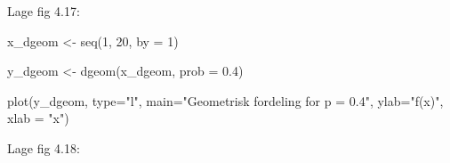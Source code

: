 \documentclass[
]{book}
\newenvironment{Shaded}{\begin{snugshade}}{\end{snugshade}}
\newcommand{\AttributeTok}[1]{\textcolor[rgb]{0.77,0.63,0.00}{#1}}
\newcommand{\DecValTok}[1]{\textcolor[rgb]{0.00,0.00,0.81}{#1}}
\newcommand{\FloatTok}[1]{\textcolor[rgb]{0.00,0.00,0.81}{#1}}
\newcommand{\FunctionTok}[1]{\textcolor[rgb]{0.00,0.00,0.00}{#1}}
\newcommand{\NormalTok}[1]{#1}
\newcommand{\OtherTok}[1]{\textcolor[rgb]{0.56,0.35,0.01}{#1}}
\newcommand{\StringTok}[1]{\textcolor[rgb]{0.31,0.60,0.02}{#1}}
\begin{document}
Lage fig 4.17:

\begin{Shaded}
\begin{Highlighting}[]
\NormalTok{x\_dgeom }\OtherTok{\textless{}{-}} \FunctionTok{seq}\NormalTok{(}\DecValTok{1}\NormalTok{, }\DecValTok{20}\NormalTok{, }\AttributeTok{by =} \DecValTok{1}\NormalTok{)}

\NormalTok{y\_dgeom }\OtherTok{\textless{}{-}} \FunctionTok{dgeom}\NormalTok{(x\_dgeom, }\AttributeTok{prob =} \FloatTok{0.4}\NormalTok{) }

\FunctionTok{plot}\NormalTok{(y\_dgeom,}
\AttributeTok{type=}\StringTok{"l"}\NormalTok{,     }
\AttributeTok{main=}\StringTok{"Geometrisk fordeling for p = 0.4"}\NormalTok{,}
\AttributeTok{ylab=}\StringTok{"f(x)"}\NormalTok{,}
\AttributeTok{xlab =} \StringTok{"x"}\NormalTok{)}
\end{Highlighting}
\end{Shaded}

Lage fig 4.18:
\end{document}
